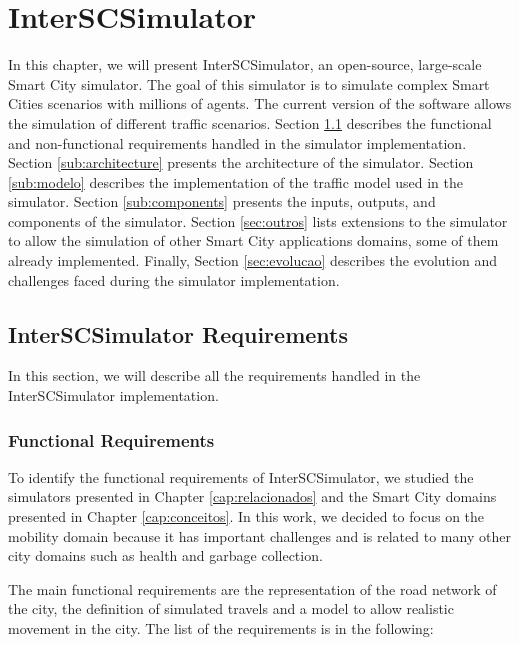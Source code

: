 \chapter{InterSCSimulator}
\label{cap:interscsimulator}

In this chapter, we will present InterSCSimulator, an open-source, large-scale Smart City simulator. The goal of this simulator is to simulate complex Smart Cities scenarios with millions of agents. The current version of the software allows the simulation of different traffic scenarios. Section \ref{sec:simulacaoRequisitos} describes the functional and non-functional requirements handled in the simulator implementation. Section \ref{sub:architecture} presents the architecture of the simulator. Section \ref{sub:modelo} describes the implementation of the traffic model used in the simulator. Section \ref{sub:components} presents the inputs, outputs, and components of the simulator. Section \ref{sec:outros} lists extensions to the simulator to allow the simulation of other Smart City applications domains, some of them already implemented. Finally, Section \ref{sec:evolucao} describes the evolution and challenges faced during the simulator implementation.

\section{InterSCSimulator Requirements}
\label{sec:simulacaoRequisitos}

In this section, we will describe all the requirements handled in the InterSCSimulator implementation. 

\subsection{Functional Requirements}
\label{subsec:requirements}

To identify the functional requirements of InterSCSimulator, we studied the simulators presented in Chapter \ref{cap:relacionados} and the Smart City domains presented in Chapter \ref{cap:conceitos}. In this work, we decided to focus on the mobility domain because it has important challenges and is related to many other city domains such as health and garbage collection.

The main functional requirements are the representation of the road network of the city, the definition of simulated travels and a model to allow realistic movement in the city. The list of the requirements is in the following:

